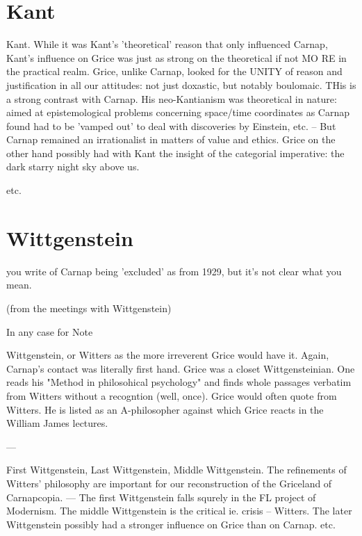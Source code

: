 \documentclass[10pt,titlepage]{book}
\begin{document}
{\section{Kant}
 
Kant. While it was Kant's 'theoretical' reason that only influenced Carnap, 
 Kant's influence on Grice was just as strong on the theoretical if not MO
RE in  the practical realm. Grice, unlike Carnap, looked for the UNITY of 
reason  and justification in all our attitudes: not just doxastic, but notably  
boulomaic. THis is a strong contrast with Carnap. His neo-Kantianism was  
theoretical in nature: aimed at epistemological problems concerning 
space/time  coordinates as Carnap found had to be 'vamped out' to deal with 
discoveries  by Einstein, etc. -- But Carnap remained an irrationalist in matters of  
value and ethics. Grice on the other hand possibly had with Kant the  
insight of the categorial imperative: the dark starry night sky above us.
 
etc. 

\section{Wittgenstein}

you write of Carnap being 'excluded' as from 1929, but it's not clear what  
you mean.

(from the meetings with Wittgenstein)
 
In any case for Note
 
Wittgenstein, or Witters as the more irreverent Grice would have it.
Again, Carnap's contact was literally first hand.
Grice was a closet Wittgensteinian.
One reads his "Method in philosohical psychology" and finds whole 
passages verbatim from Witters without a recogntion (well, once).
Grice would often quote from Witters.
He is listed as an A-philosopher against which Grice reacts in the William James lectures.
 
---
 
First Wittgenstein, Last Wittgenstein, Middle Wittgenstein. The refinements 
 of Witters' philosophy are important for our reconstruction of the 
Griceland of  Carnapcopia. --- The first Wittgenstein falls squrely in the FL 
project of  Modernism. The middle Wittgenstein is the critical ie. crisis -- 
Witters. The  later Wittgenstein possibly had  a stronger influence on Grice 
than on  Carnap.
etc.

}
\end{document}
